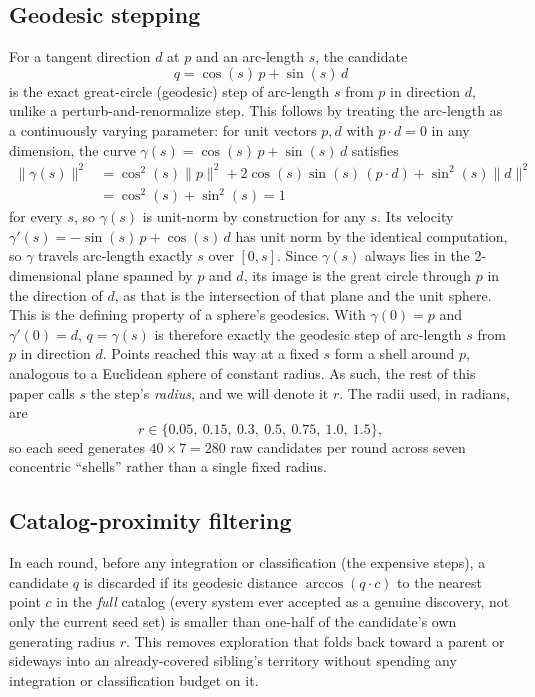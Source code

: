 \documentclass[11pt]{article}
\begin{document}
\subsection{Geodesic stepping}
\label{sec:geodesicStepping}
For a tangent direction $d$ at $p$ and an arc-length $s$, the candidate
\[
q = \cos(s)\, p + \sin(s)\, d
\]
is the exact great-circle (geodesic) step of arc-length $s$ from $p$ in
direction $d$, unlike a perturb-and-renormalize step. This follows by
treating the arc-length as a continuously varying parameter: for unit
vectors $p, d$ with $p \cdot d = 0$ in any dimension, the curve
$\gamma(s) = \cos(s)\,p + \sin(s)\,d$ satisfies
\begin{align*}
\|\gamma(s)\|^2 &= \cos^2(s)\|p\|^2 + 2\cos(s)\sin(s)\,(p \cdot d) + \sin^2(s)\|d\|^2 \\
&= \cos^2(s) + \sin^2(s) = 1
\end{align*}
for every $s$, so $\gamma(s)$ is unit-norm by construction for any $s$. Its
velocity $\gamma'(s) = -\sin(s)\,p + \cos(s)\,d$ has unit norm by the
identical computation, so $\gamma$ travels arc-length exactly $s$ over
$[0, s]$. Since $\gamma(s)$ always lies in the 2-dimensional plane spanned
by $p$ and $d$, its image is the great circle through $p$ in the direction of $d$, as that is the intersection of that plane and the unit sphere. This is the defining property of a sphere's geodesics. With $\gamma(0) = p$ and $\gamma'(0) = d$, $q = \gamma(s)$ is therefore exactly the geodesic step of arc-length $s$ from
$p$ in direction $d$. Points reached this way at a fixed $s$ form a shell
around $p$, analogous to a Euclidean sphere of constant radius. As such,
the rest of this paper calls $s$ the step's \emph{radius}, and we will
denote it $r$. The radii used, in radians, are
\[
r \in \{0.05,\ 0.15,\ 0.3,\ 0.5,\ 0.75,\ 1.0,\ 1.5\},
\]
so each seed generates $40 \times 7 = 280$ raw candidates per round across
seven concentric ``shells'' rather than a single fixed radius.

\subsection{Catalog-proximity filtering}
\label{sec:Catalog-proximity-filtering}
In each round, before any integration or classification (the expensive steps), a
candidate $q$ is discarded if its geodesic distance $\arccos(q \cdot c)$ to
the nearest point $c$ in the \emph{full} catalog (every system ever accepted
as a genuine discovery, not only the current seed set) is smaller than
one-half of the candidate's own generating radius $r$. This removes exploration that folds
back toward a parent or sideways into an already-covered sibling's territory
without spending any integration or classification budget on it.
\end{document}
